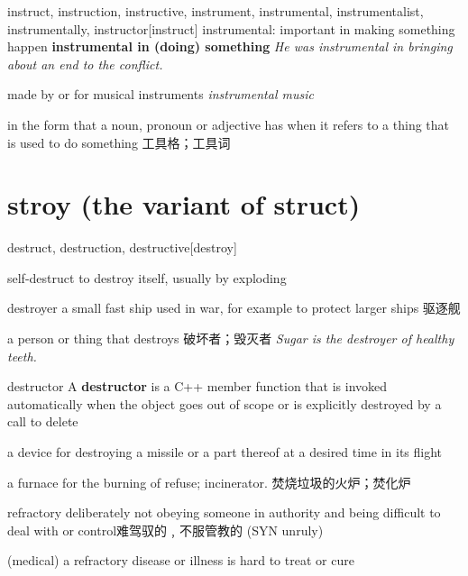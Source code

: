 \begin{DefWord}{instruct, instruction, instructive, instrument, instrumental, instrumentalist, instrumentally, instructor}[instruct]
    instrumental: important in making something happen
    \textbf{instrumental in (doing) something} \textit{He was instrumental in bringing about an end to the conflict.}

    made by or for musical instruments
    \textit{instrumental music}

    in the form that a noun, pronoun or adjective has when it refers to a thing that is used to do something 工具格；工具词


\end{DefWord}




\section{stroy (the variant of struct)}

\begin{DefWord}{destruct, destruction, destructive}[destroy]
\end{DefWord}

\begin{DefWord}{self-destruct}
    to destroy itself, usually by exploding
\end{DefWord}

\begin{DefWord}{destroyer}
    a small fast ship used in war, for example to protect larger ships 驱逐舰

    a person or thing that destroys 破坏者；毁灭者
    \textit{Sugar is the destroyer of healthy teeth.}
\end{DefWord}

\begin{DefWord}{destructor}
    A \textbf{destructor} is a C++ member function that is invoked automatically when the object goes out of scope or is explicitly destroyed by a call to delete

    a device for destroying a missile or a part thereof at a desired time in its flight

    a furnace for the burning of refuse; incinerator. 焚烧垃圾的火炉；焚化炉
\end{DefWord}

\begin{DefWord}{refractory}
    deliberately not obeying someone in authority and being difficult to deal with or control难驾驭的﹐不服管教的 (SYN  unruly)

    (medical) a refractory disease or illness is hard to treat or cure
\end{DefWord}


